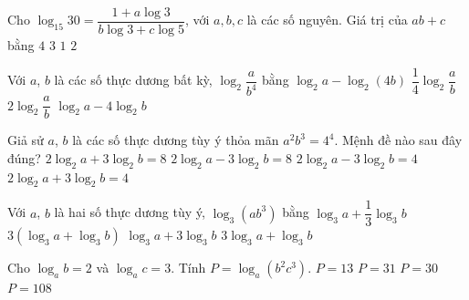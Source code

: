 \begin{ex}%
	Cho $\log _{15} 30=\dfrac{1+a \log 3}{b \log 3+c \log 5}$, với $a,  b, c$ là các số nguyên. Giá trị của $a b+c$ bằng
	 \choice
		 {$4$}
		{$3$} 
		{$1$} 
		{\True  $2$}
\end{ex}

\begin{ex}%
	Với $a$,  $b$ là các số thực dương bất kỳ, $\log_2\dfrac{a}{b^4}$ bằng
	\choice 
		{$\log_2a-\log_2\left(4b\right)$} 
		 {$\dfrac{1}{4}{\log_2}\dfrac{a}{b}$}
		 {$ 2\log_2\dfrac{a}{b}$}
		{\True $\log_2a-4\log_2b$} 
\end{ex}

\begin{ex}%
	Giả sử $a$, $b$ là  các số thực dương tùy ý thỏa mãn $a^2b^3=4^4$. Mệnh đề nào sau đây đúng?
	\choice 
		{\True $2\log_2a+3\log_2b=8$} 
		 {$2\log_2a-3\log_2b=8$}
		 {$2\log_2a-3\log_2b=4$}
		{$2\log_2a+3\log_2b=4$} 
\end{ex}

\begin{ex}%
	Với $a$, $b$ là hai số  thực dương tùy ý, $\log_3\left(ab^3\right)$ bằng
	\choice 
		{$\log_3a+\dfrac{1}{3}\log_3b$} 
		{$3(\log_3a+\log_3b)$} 
		{\True  $\log_3a+3\log_3b$}
		{$3\log_3a+\log_3b$} 
\end{ex}

\begin{ex}%
	Cho $\log_ab=2$  và $\log_ac=3$. Tính $P=\log_a\left(b^2c^3\right)$.
	 \choice
		 {\True $P=13$}
		{$P=31$} 
		 {$P=30$}
		{$P=108$} 
\end{ex}

